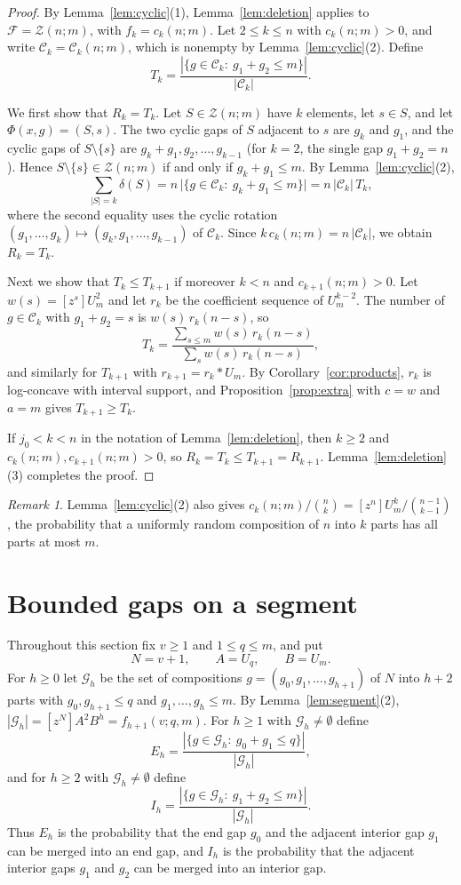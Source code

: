 \documentclass{amsart}
\theoremstyle{definition}
\theoremstyle{remark}
\newtheorem{remark}[theorem]{Remark}
\numberwithin{equation}{section}
\newcommand{\cF}{\mathcal{F}}
\newcommand{\cC}{\mathcal{C}}
\newcommand{\cG}{\mathcal{G}}
\newcommand{\Cyc}{\mathcal{Z}}
\newcommand{\coef}[1]{[z^{#1}]}
\begin{document}
\begin{proof}
By Lemma~\ref{lem:cyclic}(1), Lemma~\ref{lem:deletion} applies to $\cF=\Cyc(n;m)$, with $f_k=c_k(n;m)$. Let $2\le k\le n$ with $c_k(n;m)>0$, and write $\cC_k=\cC_k(n;m)$, which is nonempty by Lemma~\ref{lem:cyclic}(2). Define
\[
T_k=\frac{|\{g\in\cC_k:\ g_1+g_2\le m\}|}{|\cC_k|}.
\]

We first show that $R_k=T_k$. Let $S\in\Cyc(n;m)$ have $k$ elements, let $s\in S$, and let $\Phi(x,g)=(S,s)$. The two cyclic gaps of $S$ adjacent to $s$ are $g_k$ and $g_1$, and the cyclic gaps of $S\setminus\{s\}$ are $g_k+g_1,g_2,\dots,g_{k-1}$ (for $k=2$, the single gap $g_1+g_2=n$). Hence $S\setminus\{s\}\in\Cyc(n;m)$ if and only if $g_k+g_1\le m$. By Lemma~\ref{lem:cyclic}(2),
\[
\sum_{|S|=k}\delta(S)=n\,\bigl|\{g\in\cC_k:\ g_k+g_1\le m\}\bigr|=n\,|\cC_k|\,T_k,
\]
where the second equality uses the cyclic rotation $(g_1,\dots,g_k)\mapsto(g_k,g_1,\dots,g_{k-1})$ of $\cC_k$. Since $k\,c_k(n;m)=n\,|\cC_k|$, we obtain $R_k=T_k$.

Next we show that $T_k\le T_{k+1}$ if moreover $k<n$ and $c_{k+1}(n;m)>0$. Let $w(s)=\coef{s}U_m^2$ and let $r_k$ be the coefficient sequence of $U_m^{k-2}$. The number of $g\in\cC_k$ with $g_1+g_2=s$ is $w(s)\,r_k(n-s)$, so
\[
T_k=\frac{\sum_{s\le m}w(s)\,r_k(n-s)}{\sum_{s}w(s)\,r_k(n-s)},
\]
and similarly for $T_{k+1}$ with $r_{k+1}=r_k*U_m$. By Corollary~\ref{cor:products}, $r_k$ is log-concave with interval support, and Proposition~\ref{prop:extra} with $c=w$ and $a=m$ gives $T_{k+1}\ge T_k$.

If $j_0<k<n$ in the notation of Lemma~\ref{lem:deletion}, then $k\ge2$ and $c_k(n;m),c_{k+1}(n;m)>0$, so $R_k=T_k\le T_{k+1}=R_{k+1}$. Lemma~\ref{lem:deletion}(3) completes the proof.
\end{proof}

\begin{remark}\label{rem:cyclic}
Lemma~\ref{lem:cyclic}(2) also gives $c_k(n;m)/\binom nk=\coef{n}U_m^k\big/\binom{n-1}{k-1}$, the probability that a uniformly random composition of $n$ into $k$ parts has all parts at most $m$.
\end{remark}

\section{Bounded gaps on a segment}\label{sec:segment}

Throughout this section fix $v\ge1$ and $1\le q\le m$, and put
\[
N=v+1,\qquad A=U_q,\qquad B=U_m.
\]
For $h\ge0$ let $\cG_h$ be the set of compositions $g=(g_0,g_1,\dots,g_{h+1})$ of $N$ into $h+2$ parts with $g_0,g_{h+1}\le q$ and $g_1,\dots,g_h\le m$. By Lemma~\ref{lem:segment}(2), $|\cG_h|=\coef{N}A^2B^h=f_{h+1}(v;q,m)$. For $h\ge1$ with $\cG_h\neq\emptyset$ define
\[
E_h=\frac{|\{g\in\cG_h:\ g_0+g_1\le q\}|}{|\cG_h|},
\]
and for $h\ge2$ with $\cG_h\neq\emptyset$ define
\[
I_h=\frac{|\{g\in\cG_h:\ g_1+g_2\le m\}|}{|\cG_h|}.
\]
Thus $E_h$ is the probability that the end gap $g_0$ and the adjacent interior gap $g_1$ can be merged into an end gap, and $I_h$ is the probability that the adjacent interior gaps $g_1$ and $g_2$ can be merged into an interior gap.
\end{document}
